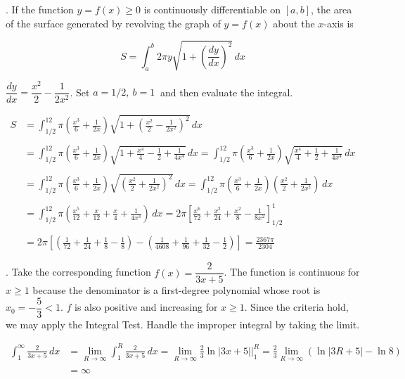 \documentclass{article}
\begin{document}
\hfill

. If the function $y=f(x)\geq0$ is continuously differentiable on $[a,b]$, the area of the surface generated by revolving the graph of $y=f(x)$ about the $x$-axis is

\[S=\int_a^b2\pi y\sqrt{1+\left(\frac{dy}{dx}\right)^2}\,dx\]

\hfill

\noindent $\dfrac{dy}{dx}=\dfrac{x^2}2-\dfrac1{2x^2}$. Set $a=1/2,\:b=1\:$ and then evaluate the integral.

\begin{align*}S&=\int_{1/2}^12\pi\left(\frac{x^3}6+\frac1{2x}\right)\sqrt{1+\left(\frac{x^2}2-\frac1{2x^2}\right)^2}\,dx\\\\&=\int_{1/2}^12\pi\left(\frac{x^3}6+\frac1{2x}\right)\sqrt{1+\frac{x^4}4-\frac12+\frac1{4x^4}}\,dx=\int_{1/2}^12\pi\left(\frac{x^3}6+\frac1{2x}\right)\sqrt{\frac{x^4}4+\frac12+\frac1{4x^4}}\,dx\\\\&=\int_{1/2}^12\pi\left(\frac{x^3}6+\frac1{2x}\right)\sqrt{\left(\frac{x^2}2+\frac1{2x^2}\right)^2}\,dx=\int_{1/2}^12\pi\left(\frac{x^3}6+\frac1{2x}\right)\left(\frac{x^2}2+\frac1{2x^2}\right)\,dx\\\\&=\int_{1/2}^12\pi\left(\frac{x^5}{12}+\frac x{12}+\frac x4+\frac1{4x^3}\right)\,dx=2\pi\left[\frac{x^6}{72}+\frac{x^2}{24}+\frac{x^2}8-\frac1{8x^2}\right]_{1/2}^1\\\\&=2\pi\left[\left(\frac1{72}+\frac1{24}+\frac{1}8-\frac18\right)-\left(\frac1{4608}+\frac1{96}+\frac1{32}-\frac12\right)\right]=\boxed{\frac{2367\pi}{2304}}\end{align*}

\hfill

. Take the corresponding function $f(x)=\dfrac2{3x+5}$. The function is continuous for $x\geq1$ because the denominator is a first-degree polynomial whose root is $x_0=-\dfrac53<1$. $f$ is also positive and increasing for $x\geq1$. Since the criteria hold, we may apply the Integral Test. Handle the improper integral by taking the limit.

\begin{align*}\int_1^{\infty}\frac{2}{3x+5}\,dx&=\lim_{R\to\infty}\int_1^R\frac{2}{3x+5}\,dx=\lim_{R\to\infty}\frac23\ln|3x+5|\bigg|_1^R=\frac23\lim_{R\to\infty}\left(\ln|3R+5|-\ln8\right)\\\\&=\infty\end{align*}
\end{document}
